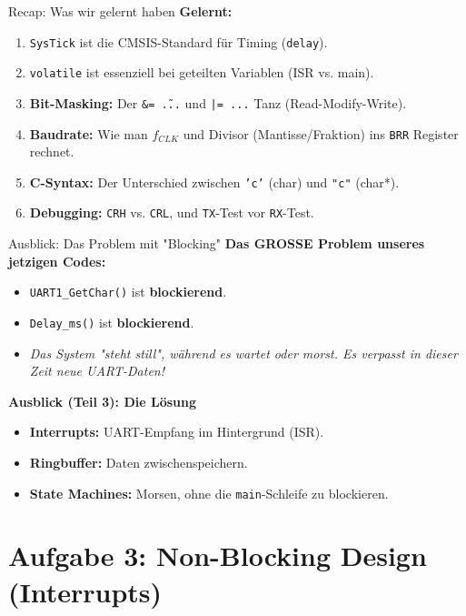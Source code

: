 \documentclass{beamer}
\begin{document}

\begin{frame}{Recap: Was wir gelernt haben}
	\textbf{Gelernt:}
	\begin{enumerate}
		\item \texttt{SysTick} ist die CMSIS-Standard für Timing (\texttt{delay}).
		\item \texttt{volatile} ist essenziell bei geteilten Variablen (ISR vs. main).
		\item \textbf{Bit-Masking:} Der \texttt{\&= \~...} und \texttt{|= ...} Tanz (Read-Modify-Write).
		\item \textbf{Baudrate:} Wie man $f_{CLK}$ und Divisor (Mantisse/Fraktion) ins \texttt{BRR} Register rechnet.
		\item \textbf{C-Syntax:} Der Unterschied zwischen \texttt{'c'} (char) und \texttt{"c"} (char*).
		\item \textbf{Debugging:} \texttt{CRH} vs. \texttt{CRL}, und \texttt{TX}-Test vor \texttt{RX}-Test.
	\end{enumerate}
\end{frame}

\begin{frame}{Ausblick: Das Problem mit "Blocking"}
	\textbf{Das GROSSE Problem unseres jetzigen Codes:}
	\begin{itemize}
		\item \texttt{UART1\_GetChar()} ist \textbf{blockierend}.
		\item \texttt{Delay\_ms()} ist \textbf{blockierend}.
		\item \textit{Das System "steht still", während es wartet oder morst. Es verpasst in dieser Zeit neue UART-Daten!}
	\end{itemize}
	
	\bigskip
	\textbf{Ausblick (Teil 3): Die Lösung}
	\begin{itemize}
		\item \textbf{Interrupts:} UART-Empfang im Hintergrund (ISR).
		\item \textbf{Ringbuffer:} Daten zwischenspeichern.
		\item \textbf{State Machines:} Morsen, ohne die \texttt{main}-Schleife zu blockieren.
	\end{itemize}
\end{frame}
\section{Aufgabe 3: Non-Blocking Design (Interrupts)}
\end{document}
